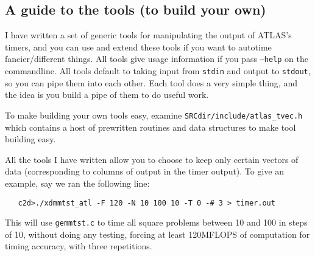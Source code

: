 \documentclass[11pt]{article}
\begin{document}
\subsection{A guide to the tools (to build your own)}
I have written a set of generic tools for manipulating the output of
ATLAS's timers, and you can use and extend these tools if you want to
autotime fancier/different things.  All tools give usage information
if you pass {\tt --help} on the commandline.  All tools default to
taking input from {\tt stdin} and output to {\tt stdout}, so you can
pipe them into each other.  Each tool does a very simple thing, and
the idea is you build a pipe of them to do useful work.

To make building your own tools easy, examine 
{\tt SRCdir/include/atlas\_tvec.h}
which contains a host of prewritten routines and data structures to 
make tool building easy.

All the tools I have written allow you to choose to keep only certain
vectors of data (corresponding to columns of output in the timer output).
To give an example, say we ran the following line:
\begin{verbatim}
   c2d>./xdmmtst_atl -F 120 -N 10 100 10 -T 0 -# 3 > timer.out
\end{verbatim}

This will use {\tt gemmtst.c} to time all square problems between 10 and
100 in steps of 10, without doing any testing, forcing at least 120MFLOPS
of computation for timing accuracy, with three repetitions.
\end{document}
